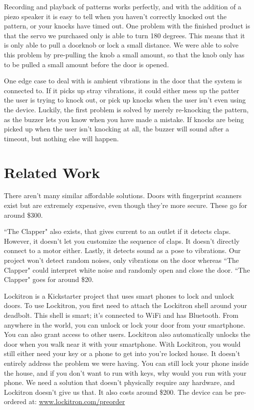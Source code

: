 \documentclass[11pt]{article}			%
\begin{document}
Recording and playback of patterns works perfectly, and with the addition of a piezo speaker it is easy to tell when you haven't correctly knocked out the pattern, or your knocks have timed out.  One problem with the finished product is that the servo we purchased only is able to turn 180 degrees.  This means that it is only able to pull a doorknob or lock a small distance.  We were able to solve this problem by pre-pulling the knob a small amount, so that the knob only has to be pulled a small amount before the door is opened.

One edge case to deal with is ambient vibrations in the door that the system is connected to.  If it picks up stray vibrations, it could either mess up the patter the user is trying to knock out, or pick up knocks when the user isn't even using the device.  Luckily, the first problem is solved by merely re-knocking the pattern, as the buzzer lets you know when you have made a mistake.  If knocks are being picked up when the user isn't knocking at all, the buzzer will sound after a timeout, but nothing else will happen.

\section{Related Work}
There aren't many similar affordable solutions. Doors with fingerprint scanners exist but are extremely expensive, even though they're more secure. These go for around \$300.

``The Clapper" also exists, that gives current to an outlet if it detects claps. However, it doesn't let you customize the sequence of claps. It doesn't directly connect to a motor either. Lastly, it detects sound as a pose to vibrations. Our project won't detect random noises, only vibrations on the door whereas ``The Clapper" could interpret white noise and randomly open and close the door. ``The Clapper" goes for around \$20. 

Lockitron is a Kickstarter project that uses smart phones to lock and unlock doors. To use Lockitron, you first need to attach the Lockitron shell around your deadbolt. This shell is smart; it's connected to WiFi and has Bluetooth. From anywhere in the world, you can unlock or lock your door from your smartphone. You can also grant access to other users. Lockitron also automatically unlocks the door when you walk near it with your smartphone. With Lockitron, you would still either need your key or a phone to get into you're locked house. It doesn't entirely address the problem we were having. You can still lock your phone inside the house, and if you don't want to run with keys, why would you run with your phone. We need a solution that doesn't physically require any hardware, and Lockitron doesn't give us that. It also costs around \$200. The device can be pre-ordered at: \url{www.lockitron.com/preorder}
\end{document}
